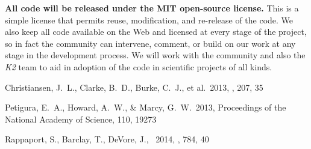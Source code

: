 \documentclass[letterpaper,12pt,preprint]{hack_aastex}
\begin{document}
\textbf{All code will be released under the MIT open-source license.}
This is a simple license that permits reuse, modification, and re-release of
the code.
We also keep all code available on the Web and licensed at every stage of
the project, so in fact the community can intervene, comment, or build on our
work at any stage in the development process.
We will work with the community and also the \textsl{K2} team to aid in
adoption of the code in scientific projects of all kinds.

\clearpage
\begin{thebibliography}{}\raggedright%

Christiansen, J.~L., Clarke, B.~D., Burke, C.~J., et al.\ 2013, \apjs, 207, 35

Petigura, E.~A., Howard, A.~W., \& Marcy, G.~W.\ 2013,
Proceedings of the National Academy of Science, 110, 19273

Rappaport, S., Barclay, T., DeVore, J., \etal\ 2014, \apj, 784, 40

\end{thebibliography}
\end{document}

